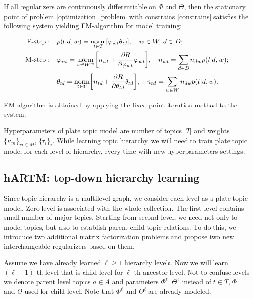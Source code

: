 \documentclass[12pt, twoside]{article}
\begin{document}
\begin{Theorem}
If all regularizers are continuously differentiable on $\Phi$ and $\Theta$, then the stationary point of problem \eqref{optimization_problem} with constrains \eqref{constrains} satisfies the following system yielding EM-algorithm for model training:

\begin{equation*}
	\begin{split}
	 \text{E-step}: \quad & p(t|d, w) = \mathop{\text{norm}}\limits_{t \in T} [\varphi_{wt} \theta_{td}], \quad w \in W, \, d \in D ;\\
	 \text{M-step}: \quad & \varphi_{wt} = \mathop{\text{norm}}\limits_{w \in W^m} \biggl[n_{wt} + \frac{\partial R}{\partial \varphi_{wt}} \varphi_{wt}\biggr], \quad n_{wt} = \sum_{d \in D} n_{dw} p(t| d, w) ;\\
	 & \theta_{td} = \mathop{\text{norm}}\limits_{t \in T} \biggl[n_{td} + \frac{\partial R}{\partial \theta_{td}} \theta_{td}\biggr], \quad n_{td} = \sum_{w \in W} n_{dw} p(t| d, w).
	 \end{split}
\end{equation*}
\end{Theorem}
EM-algorithm is obtained by applying the fixed point iteration method to the system.

Hyperparameters of plate topic model are number of topics $|T|$ and weights $\{\kappa_m\}_{m \in M}$, $\{\tau_i\}_{i}$. While learning topic hierarchy, we will need to train plate topic model for each level of hierarchy, every time with new hyperparameters settings.

\subsection{hARTM: top-down hierarchy learning}
Since topic hierarchy is a multilevel graph, we consider each level as a plate topic model. Zero level is associated with the whole collection. The first level contains small number of major topics. Starting from second level, we need not only to model topics, but also to establish parent-child topic relations. To do this, we introduce two additional matrix factorization problems and propose two new interchangeable regularizers based on them. 

Assume we have already learned $\ell \geqslant 1$ hierarchy levels. Now we will learn $(\ell+1)$-th level that is child level for $\ell$-th ancestor level. Not to confuse levels we denote parent level topics $a \in A$ and parameters $\Phi^\ell$, $\Theta^\ell$ instead of $t \in T$, $\Phi$ and $\Theta$ used for child level. Note that $\Phi^\ell$ and $\Theta^\ell$ are already modeled.
\end{document}
